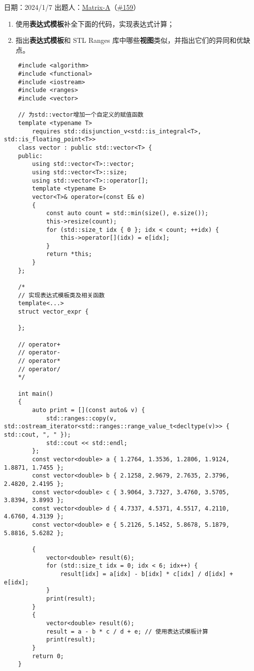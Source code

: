 日期：2024/1/7 出题人：\href{https://github.com/Matrix-A}{Matrix-A}（\href{https://github.com/Mq-b/Loser-HomeWork/issues/159}{\#159}）\\

\begin{enumerate}
    \item 使用\textbf{表达式模板}补全下面的代码，实现表达式计算；
    \item 指出\textbf{表达式模板}和 STL Ranges 库中哪些\textbf{视图}类似，并指出它们的异同和优缺点。
\end{enumerate}

\begin{verbatim}
    #include <algorithm>
    #include <functional>
    #include <iostream>
    #include <ranges>
    #include <vector>

    // 为std::vector增加一个自定义的赋值函数
    template <typename T>
        requires std::disjunction_v<std::is_integral<T>, std::is_floating_point<T>>
    class vector : public std::vector<T> {
    public:
        using std::vector<T>::vector;
        using std::vector<T>::size;
        using std::vector<T>::operator[];
        template <typename E>
        vector<T>& operator=(const E& e)
        {
            const auto count = std::min(size(), e.size());
            this->resize(count);
            for (std::size_t idx { 0 }; idx < count; ++idx) {
                this->operator[](idx) = e[idx];
            }
            return *this;
        }
    };

    /*
    // 实现表达式模板类及相关函数
    template<...>
    struct vector_expr {

    };

    // operator+
    // operator-
    // operator*
    // operator/
    */

    int main()
    {
        auto print = [](const auto& v) {
            std::ranges::copy(v, std::ostream_iterator<std::ranges::range_value_t<decltype(v)>> { std::cout, ", " });
            std::cout << std::endl;
        };
        const vector<double> a { 1.2764, 1.3536, 1.2806, 1.9124, 1.8871, 1.7455 };
        const vector<double> b { 2.1258, 2.9679, 2.7635, 2.3796, 2.4820, 2.4195 };
        const vector<double> c { 3.9064, 3.7327, 3.4760, 3.5705, 3.8394, 3.8993 };
        const vector<double> d { 4.7337, 4.5371, 4.5517, 4.2110, 4.6760, 4.3139 };
        const vector<double> e { 5.2126, 5.1452, 5.8678, 5.1879, 5.8816, 5.6282 };

        {
            vector<double> result(6);
            for (std::size_t idx = 0; idx < 6; idx++) {
                result[idx] = a[idx] - b[idx] * c[idx] / d[idx] + e[idx];
            }
            print(result);
        }
        {
            vector<double> result(6);
            result = a - b * c / d + e; // 使用表达式模板计算
            print(result);
        }
        return 0;
    }
\end{verbatim}

